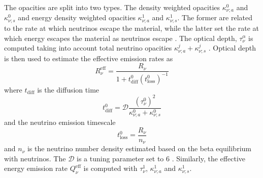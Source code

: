 %

%
%
The opacities are split into two types. The density weighted opacities $\kappa_{\nu;a}^0$ and
$\kappa_{\nu;s}^0$ and energy density weighted opacities $\kappa_{\nu;a}^1$ and $\kappa_{\nu;s}^1$. 
The former are related to the rate at which neutrinos escape the material, 
while the latter set the rate at which energy escapes the material as neutrinos escape 
\citep{Ruffert:1995fs}.
%
The optical depth, $\tau_{\nu}^{\alpha}$ is computed taking into account 
total neutrino opacities $\kappa_{\nu;a}^j + \kappa_{\nu;s}^j$ \citep{Neilsen:2014hha}.
%
Optical depth is then used to estimate the effective emission rates \citep{Ruffert:1995fs} as 
%
\begin{equation}
R_{\nu}^{\text{eff}} = \frac{R_{\nu}}{1 + t_{\text{diff}}^0(t^0_{\text{loss}})^{-1}}
\label{eq:method:whisky:Rnueff}
\end{equation}
%
where $t_{\text{diff}}$ is the diffusion time
%
\begin{equation}
t_{\text{diff}}^{0} = \mathcal{D}\frac{(\tau_{\nu}^0)^2}{\kappa_{\nu;a}^0 + \kappa_{\nu;s}^0}
\end{equation}
%
and the neutrino emission timescale 
%
\begin{equation}
t_{\text{loss}}^0 = \frac{R_{\nu}}{n_{\nu}}
\end{equation}
%
and $n_{\nu}$ is the neutrino number density estimated based on the 
beta equilibrium with neutrinos. 
The $\mathcal{D}$ is a tuning parameter set to $6$ \citep{Radice:2018pdn}.
%
Similarly, the effective energy emission rate $Q_{\nu}^{\text{eff}}$ 
is computed with $\tau_{\nu}^1$, $\kappa_{\nu;a}^1$ and $\kappa_{\nu;s}^1$.

